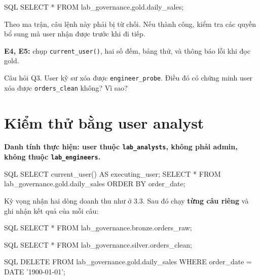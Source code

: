 \begin{aivncodebox}[language={}]{SQL}
SELECT * FROM lab_governance.gold.daily_sales;
\end{aivncodebox}

Theo ma trận, câu lệnh này phải bị từ chối. Nếu thành công, kiểm tra các quyền bổ sung mà user nhận được trước khi đi tiếp.


\begin{evidencebox}
\textbf{E4, E5:} chụp \texttt{current\_\allowbreak{}user()}, hai số đếm, bảng thử, và thông báo lỗi khi đọc gold.
\end{evidencebox}

\begin{questionbox}{Câu hỏi Q3.}
User kỹ sư xóa được \texttt{engineer\_\allowbreak{}probe}. Điều đó có chứng minh user xóa được \texttt{orders\_\allowbreak{}clean} không? Vì sao?
\end{questionbox}

\section{Kiểm thử bằng user analyst}

\textbf{Danh tính thực hiện: user thuộc \texttt{lab\_\allowbreak{}analysts}, không phải admin, không thuộc \texttt{lab\_\allowbreak{}engineers}.}\par\nopagebreak

\begin{aivncodebox}[language={}]{SQL}
SELECT current_user() AS executing_user;
SELECT * FROM lab_governance.gold.daily_sales ORDER BY order_date;
\end{aivncodebox}

Kỳ vọng nhận hai dòng doanh thu như ở 3.3. Sau đó chạy \textbf{từng câu riêng} và ghi nhận kết quả của mỗi câu:


\begin{aivncodebox}[language={}]{SQL}
SELECT * FROM lab_governance.bronze.orders_raw;
\end{aivncodebox}

\begin{aivncodebox}[language={}]{SQL}
SELECT * FROM lab_governance.silver.orders_clean;
\end{aivncodebox}

\begin{aivncodebox}[language={}]{SQL}
DELETE FROM lab_governance.gold.daily_sales
WHERE order_date = DATE '1900-01-01';
\end{aivncodebox}

